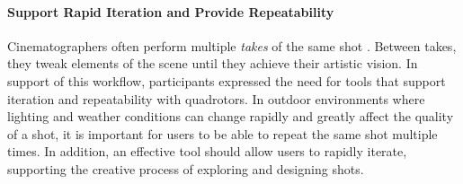 \paragraph{Support Rapid Iteration and Provide Repeatability} 
Cinematographers often perform multiple \emph{takes} of the same shot \cite{mascelli:1965}.
Between takes, they tweak elements of the scene until they achieve their artistic vision.
In support of this workflow, participants expressed the need for tools that support iteration and repeatability with quadrotors. 
In outdoor environments where lighting and weather conditions can change rapidly and greatly affect the quality of a shot, it is important for users to be able to repeat the same shot multiple times. 
In addition, an effective tool should allow users to rapidly iterate, supporting the creative process of exploring and designing shots.

